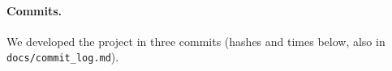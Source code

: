 \paragraph{Commits.} We developed the project in three commits (hashes and times below, also in \texttt{docs/commit\_log.md}).

\begin{table}[h]
\centering\footnotesize
\setlength{\tabcolsep}{3pt}
\resizebox{\columnwidth}{!}{}
\caption{Development commits. Commit 3 contains this report, so its hash is kept in the repository log (\texttt{docs/commit\_log.md}) and not in the PDF it ships with.}
\label{tab:commits}
\end{table}
